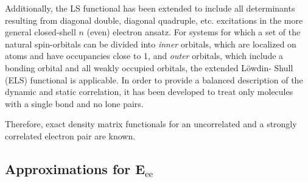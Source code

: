 \begin{enumerate}
        Additionally, the LS functional has been extended to include all 
        determinants resulting from diagonal double, diagonal quadruple, etc. 
        excitations in the more general closed-shell $n$ (even) electron ansatz.
        For systems for which a set of the natural spin-orbitals can be divided 
        into \textit{inner} orbitals, which are localized on atoms and have 
        occupancies close to 1, and \textit{outer} orbitals, which include a 
        bonding orbital and all weakly occupied orbitals, the extended Löwdin-
        Shull (ELS) functional is 
        applicable.
        In order to provide a balanced description of the dynamic and static 
        correlation, it has been developed to treat only molecules with a 
        single bond and no lone pairs.

\end{enumerate}

Therefore, exact density matrix functionals for an uncorrelated and a strongly
correlated electron pair are known.

\subsection{Approximations for $\boldsymbol{E}_{\text{ee}}$} %
\label{sec:approximated-Eee}

